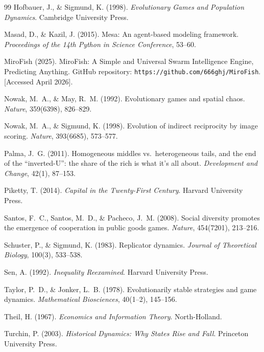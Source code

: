 \documentclass[12pt, letterpaper]{article}
\begin{document}
\begin{thebibliography}{99}
Hofbauer, J., \& Sigmund, K. (1998).
\textit{Evolutionary Games and Population Dynamics}.
Cambridge University Press.

Masad, D., \& Kazil, J. (2015).
Mesa: An agent-based modeling framework.
\textit{Proceedings of the 14th Python in Science Conference}, 53--60.

MiroFish (2025).
MiroFish: A Simple and Universal Swarm Intelligence Engine,
Predicting Anything.
GitHub repository: \texttt{https://github.com/666ghj/MiroFish}.
[Accessed April 2026].

Nowak, M.~A., \& May, R.~M. (1992).
Evolutionary games and spatial chaos.
\textit{Nature}, 359(6398), 826--829.

Nowak, M.~A., \& Sigmund, K. (1998).
Evolution of indirect reciprocity by image scoring.
\textit{Nature}, 393(6685), 573--577.

Palma, J.~G. (2011).
Homogeneous middles vs.\ heterogeneous tails, and the end of the
``inverted-U'': the share of the rich is what it's all about.
\textit{Development and Change}, 42(1), 87--153.

Piketty, T. (2014).
\textit{Capital in the Twenty-First Century}.
Harvard University Press.

Santos, F.~C., Santos, M.~D., \& Pacheco, J.~M. (2008).
Social diversity promotes the emergence of cooperation in public goods
games.
\textit{Nature}, 454(7201), 213--216.

Schuster, P., \& Sigmund, K. (1983).
Replicator dynamics.
\textit{Journal of Theoretical Biology}, 100(3), 533--538.

Sen, A. (1992).
\textit{Inequality Reexamined}.
Harvard University Press.

Taylor, P.~D., \& Jonker, L.~B. (1978).
Evolutionarily stable strategies and game dynamics.
\textit{Mathematical Biosciences}, 40(1--2), 145--156.

Theil, H. (1967).
\textit{Economics and Information Theory}.
North-Holland.

Turchin, P. (2003).
\textit{Historical Dynamics: Why States Rise and Fall}.
Princeton University Press.


\end{thebibliography}
\end{document}
